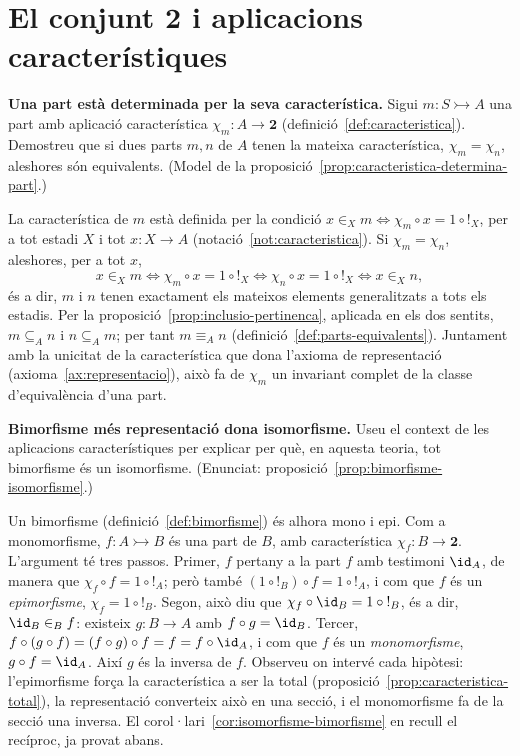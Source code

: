 \section{El conjunt \texorpdfstring{\(\mathbf2\)}{2} i aplicacions característiques}\label{prac:caracteristica}

\begin{exercici}
\textbf{Una part està determinada per la seva característica.} Sigui \(m:S\rightarrowtail A\) una part amb aplicació característica \(\chi_m:A\to\mathbf2\) (definició~\ref{def:caracteristica}). Demostreu que si dues parts \(m,n\) de \(A\) tenen la mateixa característica, \(\chi_m=\chi_n\), aleshores són equivalents. (Model de la proposició~\ref{prop:caracteristica-determina-part}.)
\end{exercici}
\begin{solucio}
La característica de \(m\) està definida per la condició \(x\in_X m\iff\chi_m\circ x=1\circ{!}_X\), per a tot estadi \(X\) i tot \(x\colon X\to A\) (notació~\ref{not:caracteristica}). Si \(\chi_m=\chi_n\), aleshores, per a tot \(x\),
\[
x\in_X m\iff\chi_m\circ x=1\circ{!}_X\iff\chi_n\circ x=1\circ{!}_X\iff x\in_X n,
\]
és a dir, \(m\) i \(n\) tenen exactament els mateixos elements generalitzats a tots els estadis. Per la proposició~\ref{prop:inclusio-pertinenca}, aplicada en els dos sentits, \(m\subseteq_A n\) i \(n\subseteq_A m\); per tant \(m\equiv_A n\) (definició~\ref{def:parts-equivalents}). Juntament amb la unicitat de la característica que dona l'axioma de representació (axioma~\ref{ax:representacio}), això fa de \(\chi_m\) un invariant complet de la classe d'equivalència d'una part.
\end{solucio}

\begin{exercici}
\textbf{Bimorfisme més representació dona isomorfisme.} Useu el context de les aplicacions característiques per explicar per què, en aquesta teoria, tot bimorfisme és un isomorfisme. (Enunciat: proposició~\ref{prop:bimorfisme-isomorfisme}.)
\end{exercici}
\begin{solucio}
Un bimorfisme (definició~\ref{def:bimorfisme}) és alhora mono i epi. Com a monomorfisme, \(f:A\rightarrowtail B\) és una part de \(B\), amb característica \(\chi_f:B\to\mathbf2\). L'argument té tres passos. Primer, \(f\) pertany a la part \(f\) amb testimoni \(\id_A\), de manera que \(\chi_f\circ f=1\circ{!}_A\); però també \((1\circ{!}_B)\circ f=1\circ{!}_A\), i com que \(f\) és un \emph{epimorfisme}, \(\chi_f=1\circ{!}_B\). Segon, això diu que \(\chi_f\circ\id_B=1\circ{!}_B\), és a dir, \(\id_B\in_B f\): existeix \(g\colon B\to A\) amb \(f\circ g=\id_B\). Tercer, \(f\circ(g\circ f)=(f\circ g)\circ f=f=f\circ\id_A\), i com que \(f\) és un \emph{monomorfisme}, \(g\circ f=\id_A\). Així \(g\) és la inversa de \(f\). Observeu on intervé cada hipòtesi: l'epimorfisme força la característica a ser la total (proposició~\ref{prop:caracteristica-total}), la representació converteix això en una secció, i el monomorfisme fa de la secció una inversa. El corol·lari~\ref{cor:isomorfisme-bimorfisme} en recull el recíproc, ja provat abans.
\end{solucio}

